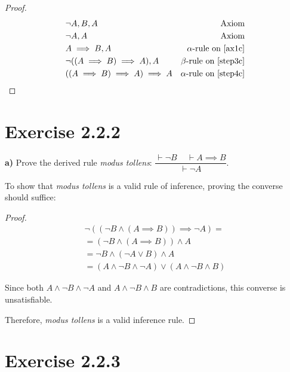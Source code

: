 \documentclass[titlepage, letterpaper, fleqn]{article}
\newcommand{\spacepls}{\vspace{5mm}}
\begin{document}
\begin{proof}
\begin{align}
& \neg A, B, A & \text{Axiom} \label{ax1c}
\\ & \neg A, A & \text{Axiom} \label{ax2c}
\\ & A \implies B, A & \text{$\alpha$-rule on \ref{ax1c}} \label{step3c}
\\ & \neg((A \implies B) \implies A), A & \text{$\beta$-rule on \ref{step3c}} \label{step4c}
\\ & ((A \implies B) \implies A) \implies A & \text{$\alpha$-rule on \ref{step4c}}
\end{align}
\end{proof}

\section{Exercise 2.2.2}

{\large \textbf{a)} Prove the derived rule \textit{modus tollens}: \(\dfrac{\vdash \neg B \, \, \, \, \, \, \, \vdash A \implies B}{\vdash \neg A}\).}

\spacepls

To show that \textit{modus tollens} is a valid rule of inference, proving the converse should suffice:

\begin{proof}
\begin{align*}
& \neg((\neg B \wedge (A \implies B)) \implies \neg A) = & \tag*{Converse}
\\ & = (\neg B \wedge (A \implies B)) \wedge A & \tag*{Material implication \& de Morgan}
\\ & = \neg B \wedge (\neg A \vee B) \wedge A & \tag*{Material implication}
\\ & = (A \wedge \neg B \wedge \neg A) \vee (A \wedge \neg B \wedge B) & \tag*{$\wedge$ is commutative, $\wedge$ distributes over $\vee$}
\end{align*}

Since both \(A \wedge \neg B \wedge \neg A\) and \(A \wedge \neg B \wedge B\) are contradictions, this converse is unsatisfiable.

Therefore, \textit{modus tollens} is a valid inference rule.
\end{proof}

\section{Exercise 2.2.3}
\end{document}
